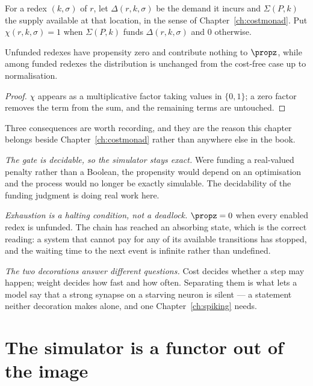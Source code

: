 \begin{definition}
\label{wt:def:gate}
For a redex $(k,\sigma)$ of $r$, let $\Delta(r,k,\sigma)$ be the demand it incurs and
$\Sigma(P,k)$ the supply available at that location, in the sense of
Chapter~\ref{ch:costmonad}. Put $\chi(r,k,\sigma) = 1$ when $\Sigma(P,k)$ funds
$\Delta(r,k,\sigma)$ and $0$ otherwise.
\end{definition}

\begin{proposition}
\label{wt:prop:gate}
Unfunded redexes have propensity zero and contribute nothing to $\propz$, while among
funded redexes the distribution is unchanged from the cost-free case up to normalisation.
\end{proposition}

\begin{proof}
$\chi$ appears as a multiplicative factor taking values in $\{0,1\}$; a zero factor
removes the term from the sum, and the remaining terms are untouched.
\end{proof}

Three consequences are worth recording, and they are the reason this chapter belongs
beside Chapter~\ref{ch:costmonad} rather than anywhere else in the book.

\emph{The gate is decidable, so the simulator stays exact.} Were funding a real-valued
penalty rather than a Boolean, the propensity would depend on an optimisation and the
process would no longer be exactly simulable. The decidability of the funding judgment is
doing real work here.

\emph{Exhaustion is a halting condition, not a deadlock.} $\propz = 0$ when every enabled
redex is unfunded. The chain has reached an absorbing state, which is the correct reading:
a system that cannot pay for any of its available transitions has stopped, and the waiting
time to the next event is infinite rather than undefined.

\emph{The two decorations answer different questions.} Cost decides whether a step may
happen; weight decides how fast and how often. Separating them is what lets a model say
that a strong synapse on a starving neuron is silent --- a statement neither decoration
makes alone, and one Chapter~\ref{ch:spiking} needs.

\section{The simulator is a functor out of the image}

